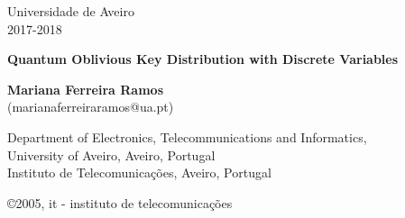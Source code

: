 \documentclass[5pt]{article}
\newcommand{\br}[1]{{\textbf{\color{itred} #1}}}%
\begin{document}
\begin{titlepage}  

\color{itblue} \sffamily \noindent \small
\hspace*{1cm}  Universidade de Aveiro\\ %
\hspace*{1cm}  2017-2018\\ %

\vspace*{1cm}
\begin{center}
    \color{black} \sffamily \noindent \Large
    \br{Quantum Oblivious Key Distribution with Discrete Variables\\}
\end{center}
\vspace{6mm}
\begin{center}
    \color{black}
    \textbf{Mariana Ferreira Ramos\\}
    {(marianaferreiraramos@ua.pt)}
\end{center}

\vspace{0.0mm}
\scriptsize
\begin{center}
Department of Electronics, Telecommunications and Informatics,\\
University of Aveiro, Aveiro, Portugal\\
Instituto de Telecomunica\c{c}\~{o}es, Aveiro, Portugal\\
\end{center}

\vspace{1.0cm}
\hspace*{13.2cm}\tiny \copyright 2005, it - instituto de telecomunica\c{c}\~{o}es\hfill

\end{titlepage}


\renewcommand{\headsep}{-25pt}

\end{document}
